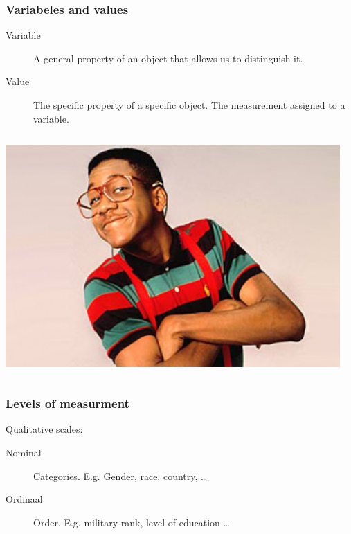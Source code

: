 \documentclass{beamer}
\begin{document}
\begin{frame}
  \frametitle{Variabeles and values}

  \begin{description}
    \item[Variable] A general property of an object that allows us to distinguish it.
    \item[Value] The specific property of a specific object. The measurement assigned to a variable.
  \end{description}

  \vspace{1cm}

  \begin{columns}[c]
    \includegraphics[width=\textwidth]{img/les1-07}

    \\
    \vspace{.5cm}
    \\
    \vspace{.5cm}

  \end{columns}
\end{frame}

\begin{frame}
  \frametitle{Levels of measurment}

  Qualitative scales:

  \begin{description}
    \item[Nominal] Categories. E.g. Gender, race, country, \ldots
    \item[Ordinaal] Order. E.g. military rank, level of education \ldots
  \end{description}

\end{frame}
\end{document}
